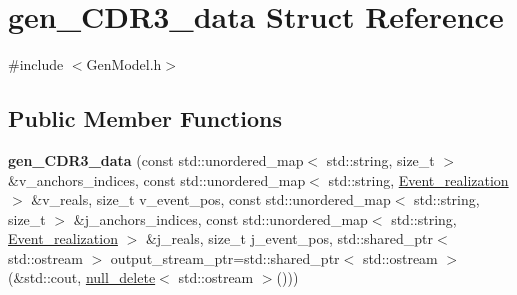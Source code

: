\hypertarget{structgen__CDR3__data}{}\section{gen\+\_\+\+C\+D\+R3\+\_\+data Struct Reference}
\label{structgen__CDR3__data}


{\ttfamily \#include $<$Gen\+Model.\+h$>$}

\subsection*{Public Member Functions}
\begin{DoxyCompactItemize}
\item 
\mbox{\label{structgen__CDR3__data_a84bc07450f621034cd1f7f2db9cc2270}} 
{\bfseries gen\+\_\+\+C\+D\+R3\+\_\+data} (const std\+::unordered\+\_\+map$<$ std\+::string, size\+\_\+t $>$ \&v\+\_\+anchors\+\_\+indices, const std\+::unordered\+\_\+map$<$ std\+::string, \hyperlink{structEvent__realization}{Event\+\_\+realization} $>$ \&v\+\_\+reals, size\+\_\+t v\+\_\+event\+\_\+pos, const std\+::unordered\+\_\+map$<$ std\+::string, size\+\_\+t $>$ \&j\+\_\+anchors\+\_\+indices, const std\+::unordered\+\_\+map$<$ std\+::string, \hyperlink{structEvent__realization}{Event\+\_\+realization} $>$ \&j\+\_\+reals, size\+\_\+t j\+\_\+event\+\_\+pos, std\+::shared\+\_\+ptr$<$ std\+::ostream $>$ output\+\_\+stream\+\_\+ptr=std\+::shared\+\_\+ptr$<$ std\+::ostream $>$(\&std\+::cout, \hyperlink{structnull__delete}{null\+\_\+delete}$<$ std\+::ostream $>$()))
\end{DoxyCompactItemize}
